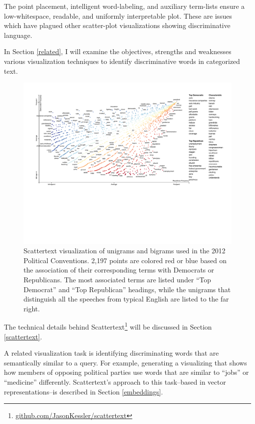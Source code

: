 \documentclass[11pt]{article}
\begin{document}
The point placement, intelligent word-labeling, and auxiliary term-lists ensure a low-whitespace, readable, and uniformly interpretable plot.  These are issues which have plagued other scatter-plot visualizations showing discriminative language.

In Section \ref{related}, I will examine the objectives, strengths and weaknesses various visualization techniques to identify discriminative words in categorized text.

\begin{figure}[h!!]
  \includegraphics[width=\linewidth]{primary_scattertext}
  \caption{Scattertext visualization of unigrams and bigrams used in the 2012 Political Conventions. 2,197 points are colored red or blue based on the association of their corresponding terms with Democrats or Republicans.  The most associated terms are listed under ``Top Democrat'' and ``Top Republican'' headings, while the unigrams that distinguish all the speeches from typical English are listed to the far right.}
\label{scattertextmain}
\vspace{-0.5cm}
\end{figure}

The technical details behind Scattertext\footnote{\href{http://www.github.com/JasonKessler/scattertext}{github.com/JasonKessler/scattertext}} will be discussed in Section \ref{scattertext}.

A related visualization task is identifying discriminating words that are semantically similar to a query.  For example, generating a visualizing that shows how members of opposing political parties use words that are similar to ``jobs'' or ``medicine'' differently. Scattertext's approach to this task--based in vector representations--is described in Section \ref{embeddings}.
\end{document}
